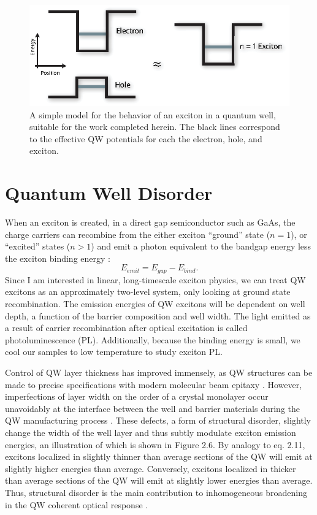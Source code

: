 \begin{figure}[h!]
\label{Spapprox}
\centering
\includegraphics[width = .9\textwidth]{SpApprox.eps}
\caption{\doublespacing A simple model for the behavior of an exciton in a quantum well, suitable for the work completed herein. The black lines correspond to the effective QW potentials for each the electron, hole, and exciton.}
\label{potentials}
\end{figure}


\newpage \section{Quantum Well Disorder}
\indent When an exciton is created, in a direct gap semiconductor such as GaAs, the charge carriers can recombine from the either exciton ``ground'' state ($n=1$), or ``excited''  states ($n>1$) and emit a photon equivalent to the bandgap energy less the exciton binding energy \cite{gilleo}:
\begin{equation}
 E_{emit} = E_{gap}-E_{bind}.
\end{equation}
Since I am interested in linear, long-timescale exciton physics, we can treat QW excitons as an approximately two-level system, only looking at ground state recombination. The emission energies of QW excitons will be dependent on well depth, a function of the barrier composition and well width. The light emitted as a result of carrier recombination after optical excitation is called photoluminescence (PL). Additionally, because the binding energy is small, we cool our samples to low temperature to study exciton PL.

\indent Control of QW layer thickness has improved immensely, as QW structures can be made to precise specifications with modern molecular beam epitaxy \cite{davies}. However, imperfections of layer width on the order of a crystal monolayer occur unavoidably at the interface between the well and barrier materials during the QW manufacturing process \cite{yoshitaterrace,weis, glinka}. These defects, a form of structural disorder, slightly change the width of the well layer and thus subtly modulate exciton emission energies, an illustration of which is shown in Figure 2.6. By analogy to eq. 2.11, excitons localized in slightly thinner than average sections of the QW will emit at slightly higher energies than average. Conversely, excitons localized in thicker than average sections of the QW will emit at slightly lower energies than average. Thus, structural disorder is the main contribution to inhomogeneous broadening in the QW coherent optical response \cite{bristowsep}. 

